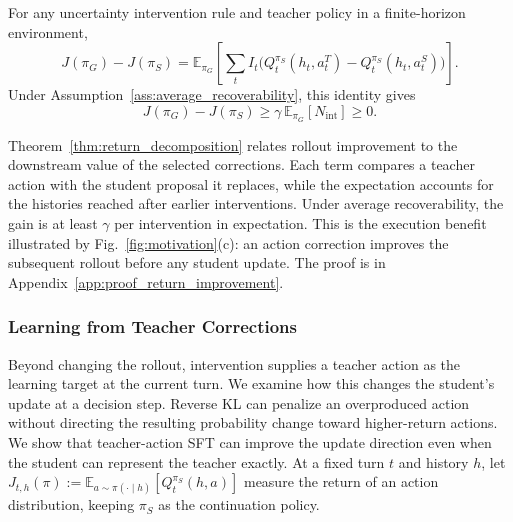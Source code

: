 \begin{theorem}
\label{thm:return_decomposition}
For any uncertainty intervention rule and teacher policy in a finite-horizon environment,
\begin{equation}
J(\pi_G)-J(\pi_S)
=\mathbb E_{\pi_G}\!\left[
\sum_t I_t
\bigl(Q_t^{\pi_S}(h_t,a_t^T)-Q_t^{\pi_S}(h_t,a_t^S)\bigr)
\right].
\label{eq:return_decomposition}
\end{equation}
Under Assumption~\ref{ass:average_recoverability}, this identity gives
\begin{equation}
J(\pi_G)-J(\pi_S)
\ge \gamma\,\mathbb E_{\pi_G}[N_{\mathrm{int}}]\ge0.
\label{eq:return_lower_bound}
\end{equation}
\end{theorem}

Theorem~\ref{thm:return_decomposition} relates rollout improvement to the downstream value of the selected corrections. Each term compares a teacher action with the student proposal it replaces, while the expectation accounts for the histories reached after earlier interventions. Under average recoverability, the gain is at least $\gamma$ per intervention in expectation. This is the execution benefit illustrated by Fig.~\ref{fig:motivation}(c): an action correction improves the subsequent rollout before any student update. The proof is in Appendix~\ref{app:proof_return_improvement}.

\subsubsection{Learning from Teacher Corrections}
\label{sec:theory_supervision}

Beyond changing the rollout, intervention supplies a teacher action as the learning target at the current turn. We examine how this changes the student's update at a decision step. Reverse KL can penalize an overproduced action without directing the resulting probability change toward higher-return actions. We show that teacher-action SFT can improve the update direction even when the student can represent the teacher exactly. 
At a fixed turn $t$ and history $h$, let $J_{t,h}(\pi):=\mathbb E_{a\sim\pi(\cdot\mid h)}[Q_t^{\pi_S}(h,a)]$ measure the return of an action distribution, keeping $\pi_S$ as the continuation policy.

